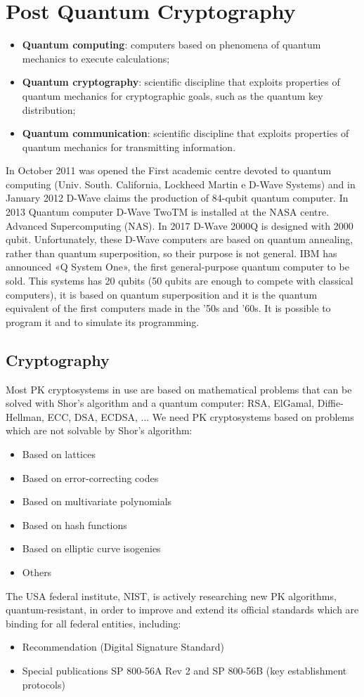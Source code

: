 \documentclass[a4paper, 10pt, titlepage]{article}
\begin{document}
\section{Post Quantum Cryptography}
\begin{itemize}
\item \textbf{Quantum computing}: computers based on phenomena of quantum mechanics to execute calculations;
\item \textbf{Quantum cryptography}: scientific discipline that exploits properties of quantum mechanics for cryptographic goals, such as the quantum key distribution;
\item \textbf{Quantum communication}: scientific discipline that exploits properties of quantum mechanics for transmitting information.
\end{itemize}
In October 2011 was opened the First academic centre devoted to quantum computing (Univ. South. California, Lockheed Martin e D-Wave Systems) and in January 2012 D-Wave claims the production of 84-qubit
quantum computer. In 2013 Quantum computer D-Wave TwoTM is installed at the NASA centre. Advanced Supercomputing (NAS). In 2017 D-Wave 2000Q is designed with 2000 qubit. Unfortunately, these D-Wave computers are based on quantum annealing, rather than quantum superposition, so their purpose is not general.
IBM has announced «Q System One», the first general-purpose quantum
computer to be sold. This systems has 20 qubits (50 qubits are enough to compete with classical computers), it is based on quantum superposition and it is the quantum equivalent of the first computers made in the '50s and '60s. It is possible to program it and to simulate its programming. 
\subsection{Cryptography}
Most PK cryptosystems in use are based on mathematical problems that can be solved with Shor's algorithm and a quantum computer: RSA, ElGamal, Diffie-Hellman, ECC, DSA, ECDSA, ...
We need PK cryptosystems based on problems which are not solvable by Shor's algorithm:
\begin{itemize}
\item Based on lattices
\item Based on error-correcting codes
\item Based on multivariate polynomials
\item Based on hash functions
\item Based on elliptic curve isogenies
\item Others
\end{itemize}
The USA federal institute, NIST, is actively researching new PK algorithms, quantum-resistant, in order to improve and extend its official standards which are binding for all federal entities, including:
\begin{itemize}
\item Recommendation (Digital Signature Standard)
\item Special publications SP 800-56A Rev 2 and SP 800-56B (key establishment protocols)
\end{itemize}
\end{document}
